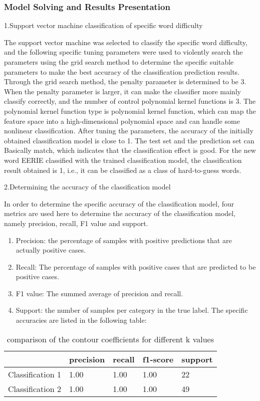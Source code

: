 \documentclass[12pt]{article}  %
\begin{document}
\subsubsection{Model Solving and Results Presentation}

1.Support vector machine classification of specific word difficulty

The support vector machine was selected to classify the specific word difficulty, and the following specific tuning parameters were used to violently search the parameters using the grid search method to determine the specific suitable parameters to make the best accuracy of the classification prediction results.
Through the grid search method, the penalty parameter is determined to be 3. When the penalty parameter is larger, it can make the classifier more mainly classify correctly, and the number of control polynomial kernel functions is 3. The polynomial kernel function type is polynomial kernel function, which can map the feature space into a high-dimensional polynomial space and can handle some nonlinear classification. After tuning the parameters, the accuracy of the initially obtained classification model is close to 1. The test set and the prediction set can 	Basically match, which indicates that the classification effect is good.
For the new word EERIE classified with the trained classification model, the classification result obtained is 1, i.e., it can be classified as a class of hard-to-guess words.

2.Determining the accuracy of the classification model

In order to determine the specific accuracy of the classification model, four metrics are used here to determine the accuracy of the classification model, namely precision, recall, F1 value and support.

\begin{enumerate}
	\item Precision: the percentage of samples with positive predictions that are actually positive cases.
	\item Recall: The percentage of samples with positive cases that are predicted to be positive cases.
	\item F1 value: The summed average of precision and recall.
	\item Support: the number of samples per category in the true label.
	The specific accuracies are listed in the following table:
\end{enumerate}

\begin{table}[hbp]
	\centering
	
	\label{tab:pagenum}
	\begin{tabular}{lllll}
		\toprule
		& precision &  recall & f1-score & support \\
		\midrule
		Classification 1  & 1.00 & 1.00 & 1.00 & 22\\
		\midrule
		Classification 2  & 1.00 & 1.00 & 1.00 & 49\\	
		\bottomrule
	\end{tabular}
	\caption{comparison of the contour coefficients for different k values}
\end{table}
\end{document}
